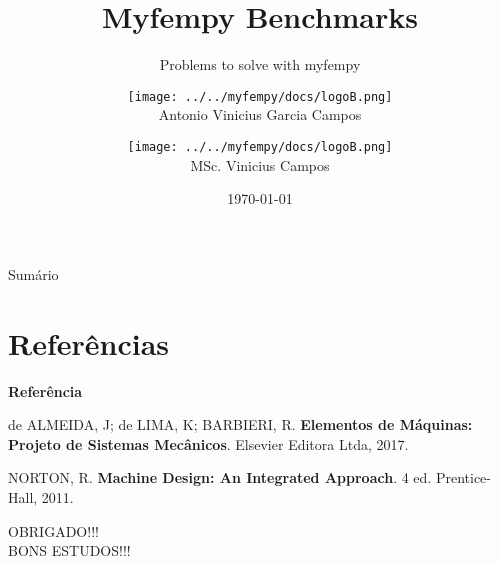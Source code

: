 \documentclass[12pt]{beamer}
\begin{document}
	\author[Antonio Vinicius Garcia Campos]{\texttt{[image: ../../myfempy/docs/logoB.png]}\\Antonio Vinicius Garcia Campos}
	\author[Vinicius Campos]{\texttt{[image: ../../myfempy/docs/logoB.png]}\\MSc. Vinicius Campos}
	\title{Myfempy Benchmarks}
	\subtitle{Problems to solve with myfempy}
	\date{\today}
	\subject{Graduação em Engenharia Mecânica}
	\begin{frame}[plain]
	\maketitle
	\end{frame}

	\begin{frame}{Sumário}
	\tableofcontents
	\end{frame}


	

\section{Referências}
\begin{thebibliography}{}
	\bibitem{}
	{\large \textbf{Referência}}
	
	\bibitem{}
	de ALMEIDA, J; de LIMA, K; BARBIERI, R. \textbf{Elementos de Máquinas: Projeto de Sistemas Mecânicos}. Elsevier Editora Ltda, 2017.
	
	\bibitem{}
	NORTON, R. \textbf{Machine Design: An Integrated Approach}. 4 ed. Prentice-Hall, 2011.
\end{thebibliography}
\newpage
\begin{center}
	$ $\\
	$ $\\
	$ $\\
	$ $\\
	$ $\\
	{\Large OBRIGADO!!!}\\
	$ $\\
	$ $\\
	{\Large BONS ESTUDOS!!!}
\end{center}
\end{document}

